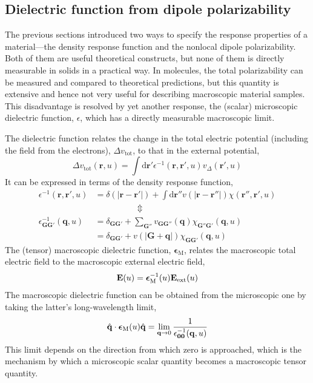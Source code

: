\subsection{Dielectric function from dipole polarizability}\label{sec:dielectric}

The previous sections introduced two ways to specify the response properties of a material---the density response function and the nonlocal dipole polarizability.
Both of them are useful theoretical constructs, but none of them is directly measurable in solids in a practical way.
In molecules, the total polarizability can be measured and compared to theoretical predictions, but this quantity is extensive and hence not very useful for describing macroscopic material samples.
This disadvantage is resolved by yet another response, the (scalar) microscopic dielectric function, $\epsilon$, which has a directly measurable macroscopic limit.

The dielectric function relates the change in the total electric potential (including the field from the electrons), $\Delta v_\text{tot}$, to that in the external potential,
\begin{equation}
  \Delta v_\text{tot}(\mathbf r,u)=\int\mathrm d\mathbf r'\epsilon^{-1}(\mathbf r,\mathbf r',u)v_\Delta(\mathbf r',u)
\end{equation}
It can be expressed in terms of the density response function,
\begin{equation}
\begin{aligned}
  \epsilon^{-1}(\mathbf r,\mathbf r',u)&=\delta(|\mathbf r-\mathbf r'|)+\int\mathrm d\mathbf r''v(|\mathbf r-\mathbf r''|)\chi(\mathbf r'',\mathbf r',u) \\
  &\hspace{5em}\Updownarrow \\
  \epsilon^{-1}_{\mathbf G\mathbf G'}(\mathbf q,u)&=\delta_{\mathbf G\mathbf G'}+\sum_{\mathbf G''}v_{\mathbf G\mathbf G''}(\mathbf q)\chi_{\mathbf G''\mathbf G'}(\mathbf q,u) \\
  &=\delta_{\mathbf G\mathbf G'}+v(|\mathbf G+\mathbf q|)\chi_{\mathbf G\mathbf G'}(\mathbf q,u)
\end{aligned}
\end{equation}
The (tensor) macroscopic dielectric function, $\boldsymbol\epsilon_\text{M}$, relates the macroscopic total electric field to the macroscopic external electric field,
\begin{equation}
  \mathbf E(u)=\boldsymbol\epsilon^{-1}_\text M(u)\mathbf E_\text{ext}(u)
\end{equation}
The macroscopic dielectric function can be obtained from the microscopic one by taking the latter's long-wavelength limit,
\begin{equation}
  \hat{\mathbf q}\cdot\boldsymbol\epsilon_\text M(u)\hat{\mathbf q}=\lim_{\mathbf q\rightarrow0}\frac1{\epsilon^{-1}_{\mathbf 0\mathbf 0}(\mathbf q,u)}
\end{equation}
This limit depends on the direction from which zero is approached, which is the mechanism by which a microscopic scalar quantity becomes a macroscopic tensor quantity.

